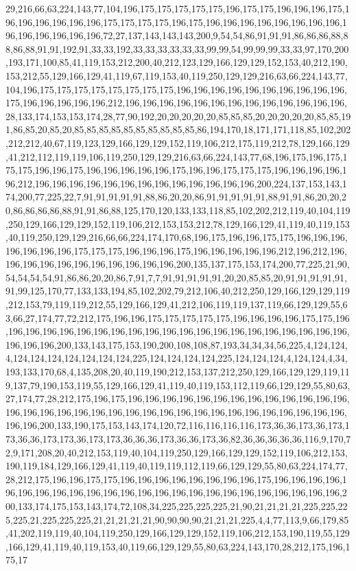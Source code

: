 29,216,66,63,224,143,77,104,196,175,175,175,175,175,196,175,175,196,196,196,175,196,196,196,196,196,196,175,175,175,175,196,175,196,196,196,196,196,196,196,196,196,196,196,196,196,196,72,27,137,143,143,143,200,9,54,54,86,91,91,91,86,86,86,88,88,86,88,91,91,192,91,33,33,192,33,33,33,33,33,33,99,99,54,99,99,99,33,33,97,170,200,193,171,100,85,41,119,153,212,200,40,212,123,129,166,129,129,152,153,40,212,190,153,212,55,129,166,129,41,119,67,119,153,40,119,250,129,129,216,63,66,224,143,77,104,196,175,175,175,175,175,175,175,175,196,196,196,196,196,196,196,196,196,196,175,196,196,196,196,196,212,196,196,196,196,196,196,196,196,196,196,196,196,196,28,133,174,153,153,174,28,77,90,192,20,20,20,20,20,85,85,85,20,20,20,20,20,85,85,191,86,85,20,85,20,85,85,85,85,85,85,85,85,85,85,86,194,170,18,171,171,118,85,102,202,212,212,40,67,119,123,129,166,129,129,152,119,106,212,175,119,212,78,129,166,129,41,212,112,119,119,106,119,250,129,129,216,63,66,224,143,77,68,196,175,196,175,175,175,196,196,175,196,196,196,196,196,175,196,196,175,175,175,196,196,196,196,196,212,196,196,196,196,196,196,196,196,196,196,196,196,196,200,224,137,153,143,174,200,77,225,22,7,91,91,91,91,91,88,86,20,20,86,91,91,91,91,91,88,91,91,86,20,20,20,86,86,86,86,88,91,91,86,88,125,170,120,133,133,118,85,102,202,212,119,40,104,119,250,129,166,129,129,152,119,106,212,153,153,212,78,129,166,129,41,119,40,119,153,40,119,250,129,129,216,66,66,224,174,170,68,196,175,196,196,175,175,196,196,196,196,196,196,196,175,175,175,196,196,196,175,196,196,196,196,196,212,196,212,196,196,196,196,196,196,196,196,196,196,196,200,135,137,175,153,174,200,77,225,21,90,54,54,54,54,91,86,86,20,20,86,7,91,7,7,91,91,91,91,91,20,20,85,85,20,91,91,91,91,91,91,99,125,170,77,133,133,194,85,102,202,79,212,106,40,212,250,129,166,129,129,119,212,153,79,119,119,212,55,129,166,129,41,212,106,119,119,137,119,66,129,129,55,63,66,27,174,77,72,212,175,196,196,175,175,175,175,175,196,196,196,196,175,175,196,196,196,196,196,196,196,196,196,196,196,196,196,196,196,196,196,196,196,196,196,196,196,196,200,133,143,175,153,190,200,108,108,87,193,34,34,34,56,225,4,124,124,4,124,124,124,124,124,124,124,225,124,124,124,124,225,124,124,124,4,124,124,4,34,193,133,170,68,4,135,208,20,40,119,190,212,153,137,212,250,129,166,129,129,119,119,137,79,190,153,119,55,129,166,129,41,119,40,119,153,112,119,66,129,129,55,80,63,27,174,77,28,212,175,196,175,196,196,196,196,196,196,196,196,196,196,196,196,196,196,196,196,196,196,196,196,196,196,196,196,196,196,196,196,196,196,196,196,196,196,196,200,133,190,175,153,143,174,120,72,116,116,116,116,173,36,36,173,36,173,173,36,36,173,173,36,173,173,36,36,36,173,36,36,173,36,82,36,36,36,36,36,116,9,170,72,9,171,208,20,40,212,153,119,40,104,119,250,129,166,129,129,152,119,106,212,153,190,119,184,129,166,129,41,119,40,119,119,112,119,66,129,129,55,80,63,224,174,77,28,212,175,196,196,175,175,196,196,196,196,196,196,196,196,175,196,196,196,196,196,196,196,196,196,196,196,196,196,196,196,196,196,196,196,196,196,196,196,196,200,133,174,175,153,143,174,72,108,34,225,225,225,225,21,90,21,21,21,21,225,225,225,225,21,225,225,225,21,21,21,21,21,90,90,90,90,21,21,21,225,4,4,77,113,9,66,179,85,41,202,119,119,40,104,119,250,129,166,129,129,152,119,106,212,153,190,119,55,129,166,129,41,119,40,119,153,40,119,66,129,129,55,80,63,224,143,170,28,212,175,196,175,17